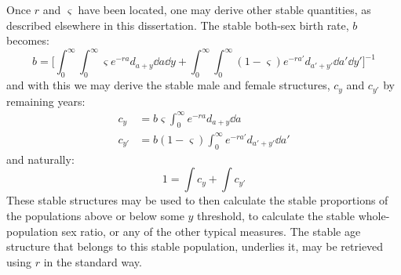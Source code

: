 
Once $r$ and $\varsigma$ have been located, one may derive other stable
quantities, as described elsewhere in this dissertation. The stable both-sex
birth rate, $b$ becomes:
\begin{equation}
b = \Bigg[\int_0^\infty  \int _0^\infty \varsigma
 e^{-ra}d_{a+y}\dd a \dd y + \int_0^\infty \int _0^\infty (1-\varsigma)
 e^{-ra'}d_{a'+y'} \dd a' \dd y' \Bigg] ^{-1}
\end{equation}
and with this we may derive the stable male and female structures, $c_y$ and
$c_{y'}$ by remaining years:
\begin{align}
\label{eq:schoenexcy}
c_y &= b\varsigma \int _0^\infty e^{-ra}d_{a+y}\dd a \\
c_{y'} &= b(1-\varsigma) \int _0^\infty e^{-ra'}d_{a'+y'}\dd a'
\end{align}
and naturally:
\begin{equation}
1 = \int c_y + \int c_{y'}
\end{equation}
These stable structures may be used to then calculate the stable proportions of
the populations above or below some $y$ threshold, to calculate the stable
whole-population sex ratio, or any of the other typical measures. The stable age
structure that belongs to this stable population, underlies it, may be retrieved
using $r$ in the standard way.
